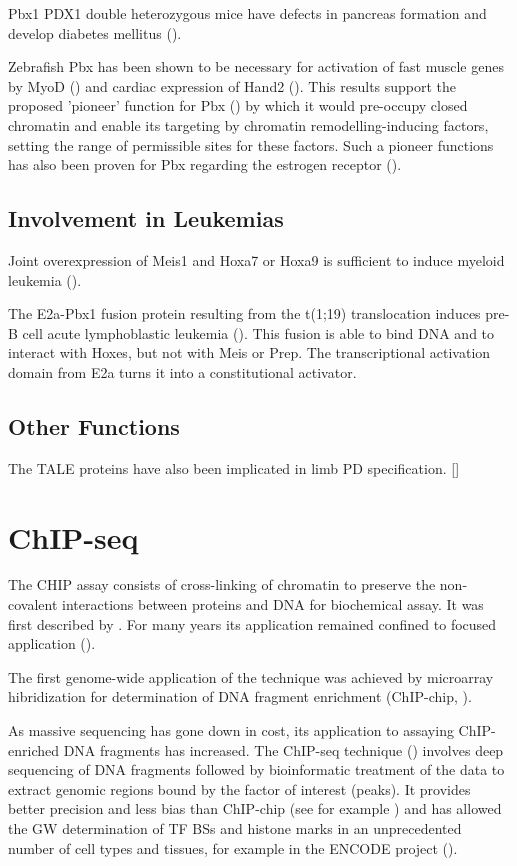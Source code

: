 Pbx1 PDX1 double heterozygous mice have defects in pancreas formation and develop diabetes mellitus (\cite{Kim2002}). 

Zebrafish Pbx has been shown to be necessary for activation of fast muscle genes by MyoD (\cite{Maves2007}) and cardiac expression of Hand2 (\cite{Maves2009}). This results support the proposed 'pioneer' function for Pbx (\cite{Berkes2004}) by which it would pre-occupy closed chromatin and enable its targeting by chromatin remodelling-inducing factors, setting the range of permissible sites for these factors. Such a pioneer functions has also been proven for Pbx regarding the estrogen receptor (\cite{Magnani2011}). %

\subsection{Involvement in Leukemias}

Joint overexpression of Meis1 and Hoxa7 or Hoxa9 is sufficient to induce myeloid leukemia (\cite{Nakamura1996, Schnabel2000}).

The E2a-Pbx1 fusion protein resulting from the t(1;19) translocation induces pre-B cell acute lymphoblastic leukemia (\cite{Kamps1990}). This fusion is able to bind DNA and to interact with Hoxes, but not with Meis or Prep. The transcriptional activation domain from E2a turns it into a constitutional activator. 

\subsection{Other Functions}

The \ac{TALE} proteins have also been implicated in limb \ac{PD} specification. []

\section{ChIP-seq}


The \ac{CHIP} assay consists of cross-linking of chromatin to preserve the non-covalent interactions between proteins and DNA for biochemical assay. It was first described by \cite{Solomon1988}. For many years its application remained confined to focused application (\cite{Mardis2007}).  

The first genome-wide application of the technique was achieved by microarray hibridization for determination of DNA fragment enrichment (ChIP-chip, \cite{Ren2000}). 

As massive sequencing has gone down in cost, its application to assaying ChIP-enriched DNA fragments has increased. The ChIP-seq technique (\cite{Robertson2007}) involves deep sequencing of DNA fragments followed by bioinformatic treatment of the data to extract genomic regions bound by the factor of interest (peaks). It provides better precision and less bias than ChIP-chip (see for example \cite{Rhee2011}) and has allowed the \ac{GW} determination of \ac{TF} \acp{BS} and histone  marks in an unprecedented number of cell types and tissues, for example in the ENCODE project (\cite{2004, 2007, 2012}).



